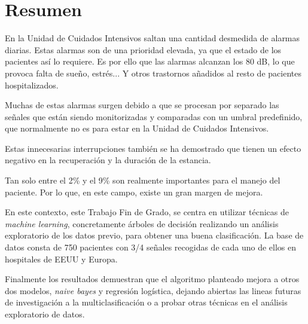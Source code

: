 \chapter* {Resumen}


	En la Unidad de Cuidados Intensivos saltan una cantidad desmedida de alarmas diarias. Estas alarmas son de una prioridad elevada, ya que el estado de los pacientes así lo requiere. Es por ello que las alarmas alcanzan los 80 dB, lo que provoca falta de sueño, estrés... Y otros trastornos añadidos al resto de pacientes hospitalizados.\par
	\vspace*{0.75cm}
	Muchas de estas alarmas surgen debido a que se procesan por separado las señales que están siendo monitorizadas y comparadas con un umbral predefinido, que normalmente no es para estar en la Unidad de Cuidados Intensivos.\par
	\vspace*{0.75cm}
	Estas innecesarias interrupciones también se ha demostrado que tienen un efecto negativo en la recuperación y la duración de la estancia. \par
Tan solo entre el 2\% y el 9\% son realmente importantes para el manejo del paciente. Por lo que, en este campo, existe un gran margen de mejora.\par 
	\vspace*{0.75cm}
	En este contexto, este Trabajo Fin de Grado, se centra en utilizar técnicas de \textit{machine learning}, concretamente árboles de decisión realizando un análisis exploratorio de los datos previo, para obtener una buena clasificación. La base de datos consta de 750 pacientes con 3/4 señales recogidas de cada uno de ellos en hospitales de EEUU y Europa.\\
	\vspace*{0.75cm}
	
	Finalmente los resultados demuestran que el algoritmo planteado mejora a otros dos modelos, \textit{naive bayes} y regresión logística, dejando abiertas las lineas futuras de investigación a la multiclasificación o a probar otras técnicas en el análisis exploratorio de datos.
	
	
